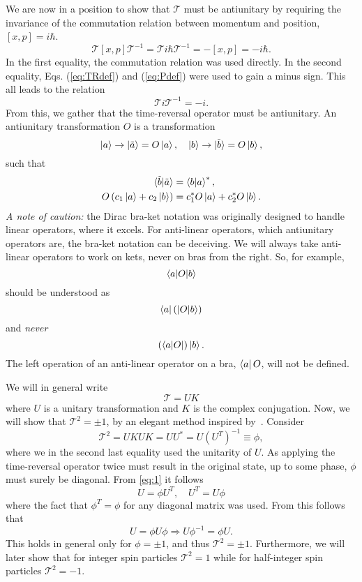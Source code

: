 We are now in a position to show that $\mathcal{T}$ must be antiunitary by requiring the invariance of the commutation relation between momentum and position, $[x, p] = i\hbar$.
\begin{equation}
  \mathcal{T} [x, p] \mathcal{T}^{-1} = \mathcal{T} i\hbar \mathcal{T}^{-1} = - [x, p] = -i\hbar.
\end{equation}
In the first equality, the commutation relation was used directly.
In the second equality, Eqs. (\ref{eq:TRdef}) and (\ref{eq:Pdef}) were used to gain a minus sign.
This all leads to the relation
\begin{equation}
  \mathcal{T} i \mathcal{T}^{-1} = -i.
\end{equation}
From this, we gather that the time-reversal operator must be antiunitary.
An antiunitary transformation \( O \) is a transformation
$$
\ket{a} \rightarrow \ket{\tilde{a}} = O \ket{a}, \quad
\ket{b} \rightarrow \ket{\tilde{b}} = O \ket{b},
$$
such that
\begin{align}
  \braket{\tilde{b} | \tilde{a}} &= \braket{b | a}^*,\\
  O\left(c_1 \ket{a} + c_2 \ket{b}\right) &= c_1^* O\ket{a} + c_2^* O\ket{b}.
\end{align}
\emph{A note of caution:} the Dirac bra-ket notation was originally designed to handle linear operators, where it excels.
For anti-linear operators, which antiunitary operators are, the bra-ket notation can be deceiving.
We will always take anti-linear operators to work on kets, never on bras from the right.
So, for example,
$$ \braket{a| O | b} $$
should be understood as
$$ \bra{a} \left(\ket{O |b}\right)$$
and \emph{never}
$$ \left(\bra{a|O}\right) \ket{b}.$$
The left operation of an anti-linear operator on a bra, $\bra{a} O$, will not be defined.

We will in general write
\begin{equation}
  \label{eq:time-rev-def}
  \mathcal{T} = U K
\end{equation}
where $U$ is a unitary transformation and $K$ is the complex conjugation.
Now, we will show that $\mathcal{T}^2 = \pm 1$, by an elegant method inspired by~\textcite{bernevigTopologicalInsulatorsTopological2013}.
Consider
\begin{equation}
  \label{eq:1}
  \mathcal{T}^2 = UKUK = UU^* = U(U^T)^{-1} \equiv \phi,
\end{equation}
where we in the second last equality used the unitarity of $U$.
As applying the time-reversal operator twice must result in the original state, up to some phase, $\phi$ must surely be diagonal.
From \cref{eq:1} it follows
\begin{equation}
  U = \phi U^T, \quad U^T = U \phi
\end{equation}
where the fact that $\phi^T = \phi$ for any diagonal matrix was used.
From this follows that
\begin{equation}
  U = \phi U \phi \Rightarrow U \phi^{-1} = \phi U.
\end{equation}
This holds in general only for $\phi = \pm 1$, and thus $\mathcal{T}^2 = \pm 1$.
Furthermore, we will later show that for integer spin particles $\mathcal{T}^2 = 1$ while for half-integer spin particles $\mathcal{T}^2 = -1$.

